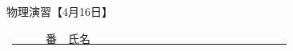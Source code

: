 \documentclass[a4paper,10pt]{jsarticle}
\begin{document}
\hakosyokika
\begin{center}
{\Large 物理演習【4月16日】}
\end{center}
\hfill ~\underline{~~~~~~番　氏名~~~~~~~~~~~~~~~~~~~~~~~~~~~~~~~~~~~}
\hakosyokika
\begin{enumerate}
    
\newpage
    
\newpage
    
\newpage
    
\end{enumerate}
\end{document}
